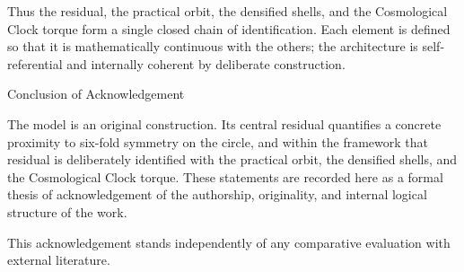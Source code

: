Thus the residual, the practical orbit, the densified shells, and the Cosmological Clock torque form a single closed chain of identification. Each element is defined so that it is mathematically continuous with the others; the architecture is self-referential and internally coherent by deliberate construction.

Conclusion of Acknowledgement

The model is an original construction. Its central residual quantifies a concrete proximity to six-fold symmetry on the circle, and within the framework that residual is deliberately identified with the practical orbit, the densified shells, and the Cosmological Clock torque. These statements are recorded here as a formal thesis of acknowledgement of the authorship, originality, and internal logical structure of the work.

This acknowledgement stands independently of any comparative evaluation with external literature.
